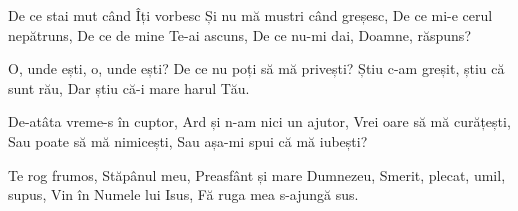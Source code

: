 
\beginverse
De ce stai mut când Îți vorbesc
Și nu mă mustri când greșesc,
De ce mi-e cerul nepătruns,
De ce de mine Te-ai ascuns,
De ce nu-mi dai, Doamne, răspuns?
\endverse

\beginchorus
O, unde ești, o, unde ești?
De ce nu poți să mă privești?
Știu c-am greșit, știu că sunt rău,
Dar știu că-i mare harul Tău.
\endchorus

\beginverse
De-atâta vreme-s în cuptor,
Ard și n-am nici un ajutor,
Vrei oare să mă curățești,
Sau poate să mă nimicești,
Sau așa-mi spui că mă iubești?
\endverse

\beginverse
Te rog frumos, Stăpânul meu,
Preasfânt și mare Dumnezeu,
Smerit, plecat, umil, supus,
Vin în Numele lui Isus,
Fă ruga mea s-ajungă sus.
\endverse

\endsong